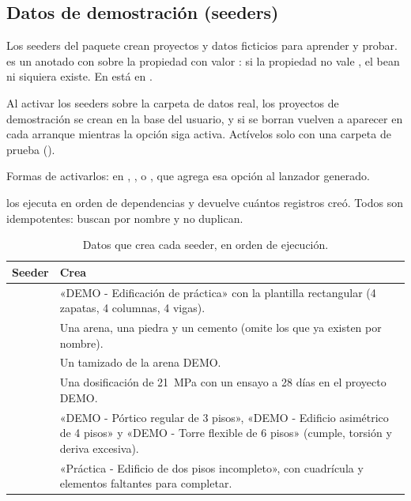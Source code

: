 \subsection{Datos de demostración (seeders)}

Los seeders del paquete  crean proyectos y datos ficticios para aprender y probar.
 es un  anotado con
 sobre la propiedad  con valor : si la propiedad no vale
, el bean ni siquiera existe. En  está en .

\begin{advertencia}
Al activar los seeders sobre la carpeta de datos real, los proyectos de demostración se crean en la base del usuario,
y si se borran vuelven a aparecer en cada arranque mientras la opción siga activa. Actívelos solo con una carpeta de
prueba ().
\end{advertencia}

Formas de activarlos:  en ,
, o
, que agrega esa opción al lanzador generado.

 los ejecuta en orden de dependencias y devuelve cuántos registros creó.
Todos son idempotentes: buscan por nombre y no duplican.

\begin{table}[H]
	\centering
	\caption{Datos que crea cada seeder, en orden de ejecución.}
	\label{tab:bd-seeders}
	\begin{tabular}{L{4.4cm}L{9.4cm}}
		\hline
		\textbf{Seeder} & \textbf{Crea} \\ \hline
		 & «DEMO - Edificación de práctica» con la plantilla rectangular (4 zapatas, 4 columnas,
		4 vigas). \\
		 & Una arena, una piedra y un cemento (omite los que ya existen por nombre). \\
		 & Un tamizado de la arena DEMO. \\
		 & Una dosificación de 21~MPa con un ensayo a 28 días en el proyecto DEMO. \\
		 & «DEMO - Pórtico regular de 3 pisos», «DEMO - Edificio asimétrico de 4 pisos» y
		«DEMO - Torre flexible de 6 pisos» (cumple, torsión y deriva excesiva). \\
		 & «Práctica - Edificio de dos pisos incompleto», con cuadrícula y elementos
		faltantes para completar. \\ \hline
	\end{tabular}
\end{table}


